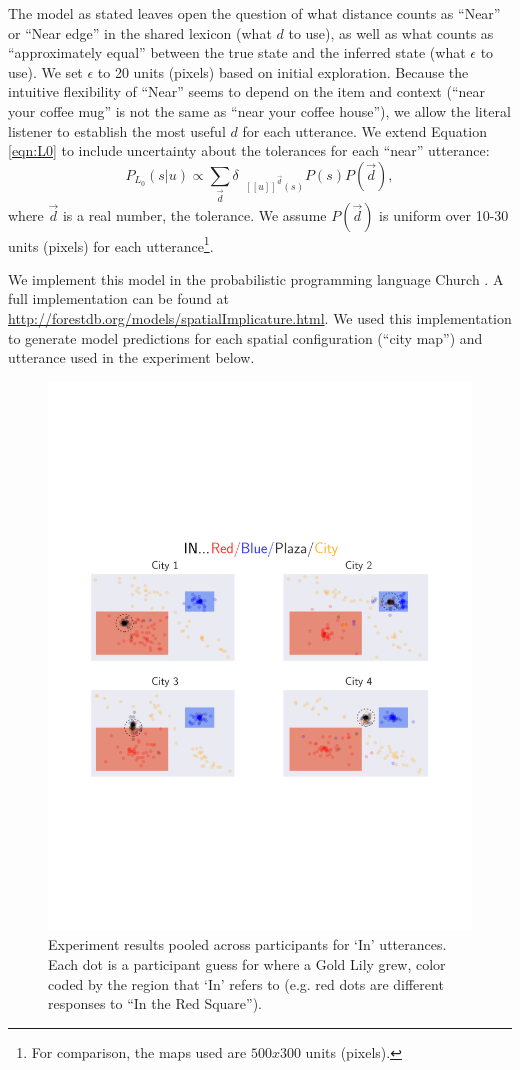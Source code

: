 \documentclass[10pt,letterpaper]{article}
\newcommand{\denote}[1]{\mbox{ $[\![ #1 ]\!]$}}
\begin{document}
The model as stated leaves open the question of what distance counts as ``Near'' or ``Near edge'' in the shared lexicon (what $d$ to use), as well as what counts as ``approximately equal'' between the true state and the inferred state (what $\epsilon$ to use). We set $\epsilon$ to 20 units (pixels) based on initial exploration. Because the intuitive flexibility of ``Near'' seems to depend on the item and context (``near your coffee mug'' is not the same as ``near your coffee house''), we allow the literal listener to establish the most useful $d$ for each utterance.
We extend Equation \ref{eqn:L0} to include uncertainty about the tolerances for each ``near'' utterance:
\begin{equation}
P_{L_0}(s|u)\propto \sum_{\vec{d}} \delta_{\denote{u}^{\vec{d}}(s)} P(s) P(\vec{d})\label{eqn:L0tol},
\end{equation}
where $\vec{d}$ is a real number, the tolerance. We assume $P(\vec{d})$ is uniform over 10-30 units (pixels) for each utterance\footnote{For comparison, the maps used are $500x300$ units (pixels).}. 

We implement this model in the probabilistic programming language Church \cite{goodman2012church}. A full implementation can be found at \url{http://forestdb.org/models/spatialImplicature.html}. We used this implementation to generate model predictions for each spatial configuration (``city map'') and utterance used in the experiment below.

\begin{figure}[!t]
\center
\includegraphics[width=.79\textwidth]{figures/In.pdf}
\caption{Experiment results pooled across participants for `In' utterances. Each dot is a participant guess for where a Gold Lily grew, color coded by the region that `In' refers to (e.g. red dots are different responses to ``In the Red Square'').}
\label{fig:In}
\end{figure}
\end{document}
